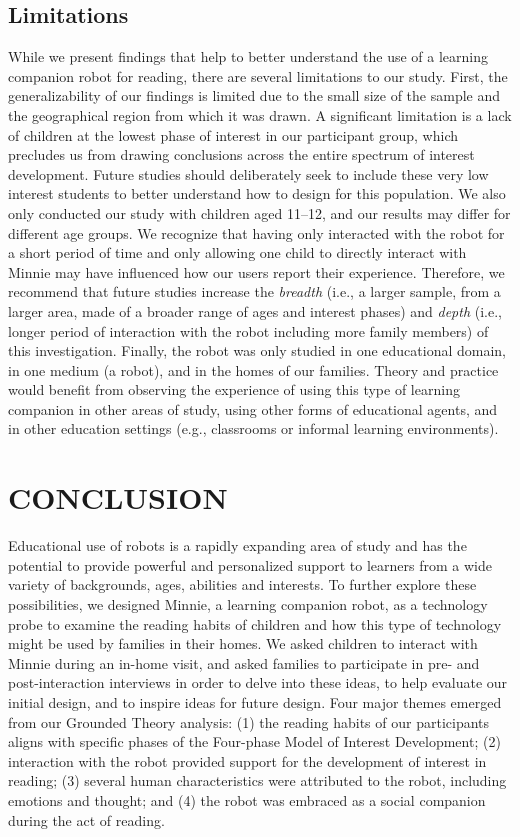 \documentclass{sigchi}
\begin{document}
\subsection{Limitations}
While we present findings that help to better understand the use of a learning companion robot for reading, there are several limitations to our study. First, the generalizability of our findings is limited due to the small size of the sample and the geographical region from which it was drawn. A significant limitation is a lack of children at the lowest phase of interest in our participant group, which precludes us from drawing conclusions across the entire spectrum of interest development. Future studies should deliberately seek to include these very low interest students to better understand how to design for this population. We also only conducted our study with children aged 11--12, and our results may differ for different age groups. We recognize that having only interacted with the robot for a short period of time and only allowing one child to directly interact with Minnie may have influenced how our users report their experience. Therefore, we recommend that future studies increase the \textit{breadth} (i.e., a larger sample, from a larger area, made of a broader range of ages and interest phases) and \textit{depth} (i.e., longer period of interaction with the robot including more family members) of this investigation. Finally, the robot was only studied in one educational domain, in one medium (a robot), and in the homes of our families. Theory and practice would benefit from observing the experience of using this type of learning companion in other areas of study, using other forms of educational agents, and in other education settings (e.g., classrooms or informal learning environments).

\section{CONCLUSION}
Educational use of robots is a rapidly expanding area of study and has the potential to provide powerful and personalized support to learners from a wide variety of backgrounds, ages, abilities and interests. To further explore these possibilities, we designed Minnie, a learning companion robot, as a technology probe to examine the reading habits of children and how this type of technology might be used by families in their homes. We asked children to interact with Minnie during an in-home visit, and asked families to participate in pre- and post-interaction interviews in order to delve into these ideas, to help evaluate our initial design, and to inspire ideas for future design. Four major themes emerged from our Grounded Theory analysis: (1) the reading habits of our participants aligns with specific phases of the Four-phase Model of Interest Development; (2) interaction with the robot provided support for the development of interest in reading; (3) several human characteristics were attributed to the robot, including emotions and thought; and (4) the robot was embraced as a social companion during the act of reading.
\end{document}
